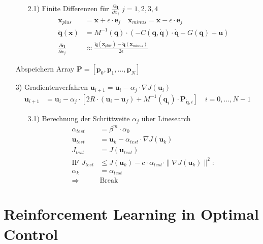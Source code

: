 \documentclass[a4paper, 12pt]{scrartcl}
\begin{document}
\begin{itemize}
\begin{itemize}
        \item[2.1)] Finite Differenzen für $\frac{\partial \ddot{\bm{q}}}{\partial x_j}$ $j=1,2,3,4$
        \begin{align*}
            \bm{x}_{plus}  &= \bm{x} + \epsilon \cdot \bm{e}_j
            \quad
            \bm{x}_{minus}  = \bm{x} - \epsilon \cdot \bm{e}_j
            \\
            \ddot{\bm{q}}(\bm{x}) 
            &= M^{-1}(\bm{q}) 
            \cdot ( - C(\bm{q},\dot{\bm{q}}) \cdot \dot{\bm{q}} - G(\bm{q}) + \bm{u} ) \\
            \frac{\partial \ddot{\bm{q}}}{\partial x_j}
            &\approx
            \frac{\ddot{\bm{q}}(\bm{x}_{plus}) - \ddot{\bm{q}}(\bm{x}_{minus})}{2 \epsilon}
        \end{align*}
    \end{itemize}
    Abspeichern Array $\bm{P} = [\bm{p}_0, \bm{p}_1, \ldots, \bm{p}_N]$
    \item[3)] Gradientenverfahren 
    $\bm{u}_{i+1} = \bm{u}_i - \alpha_j \cdot \nabla J(\bm{u}_i)$
    \begin{align*}
        \bm{u}_{i+1} &= \bm{u}_i - \alpha_j \cdot 
        \left[
            2 R \cdot (\bm{u}_i - \bm{u}_f) + M^{-1}(\bm{q}_i) \cdot \bm{P}_{\dot{\bm{q}},i}
        \right]
        \quad i = 0, \ldots, N-1    
    \end{align*}
        \begin{itemize}
            \item[3.1)] Berechnung der Schrittweite $\alpha_j$ über Linesearch
            \begin{align*}
                \alpha_{test} &= \beta^m \cdot \alpha_0 \\
                \bm{u}_{test} &= \bm{u}_k - \alpha_{test} \cdot \nabla J(\bm{u}_k) \\
                J_{test} &= J(\bm{u}_{test})  
                \\
                \text{IF } J_{test} &\leq J(\bm{u}_k) - c \cdot \alpha_{test} \cdot \|\nabla J(\bm{u}_k)\|^2: \\
                    \alpha_k &= \alpha_{test} \\
                    \Rightarrow &\text{Break}
            \end{align*}
        \end{itemize}
\end{itemize}

\newpage

\section{Reinforcement Learning in Optimal Control}

\newpage


\printbibliography
\end{document}
